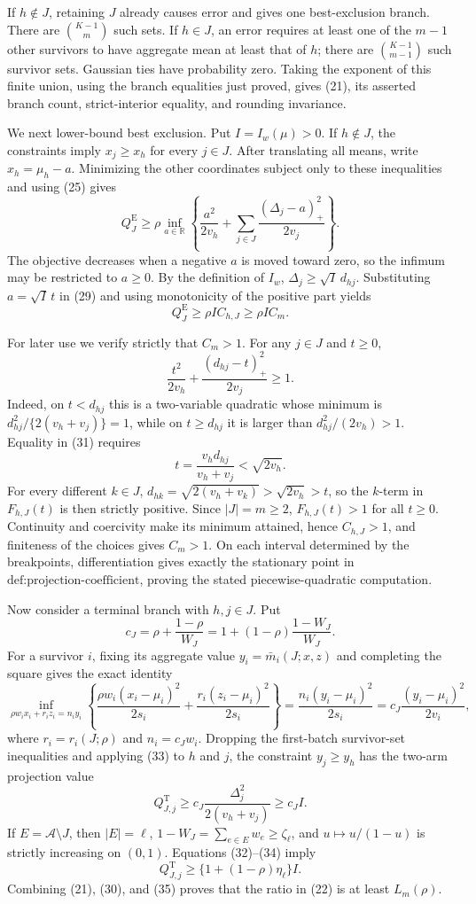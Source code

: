 If \(h\notin J\), retaining \(J\) already causes error and gives one best-exclusion branch. There are \(\binom{K-1}{m}\) such sets. If \(h\in J\), an error requires at least one of the \(m-1\) other survivors to have aggregate mean at least that of \(h\); there are \(\binom{K-1}{m-1}\) such survivor sets. Gaussian ties have probability zero. Taking the exponent of this finite union, using the branch equalities just proved, gives (21), its asserted branch count, strict-interior equality, and rounding invariance.

We next lower-bound best exclusion. Put \(I=I_w(\mu)>0\). If \(h\notin J\), the constraints imply \(x_j\ge x_h\) for every \(j\in J\). After translating all means, write \(x_h=\mu_h-a\). Minimizing the other coordinates subject only to these inequalities and using (25) gives
\[
 Q_J^{\mathrm E}\ge \rho\inf_{a\in\mathbb R}
 \left\{\frac{a^2}{2v_h}+\sum_{j\in J}\frac{(\Delta_j-a)_+^2}{2v_j}\right\}. \tag{29}
\]
The objective decreases when a negative \(a\) is moved toward zero, so the infimum may be restricted to \(a\ge0\). By the definition of \(I_w\), \(\Delta_j\ge\sqrt I\,d_{hj}\). Substituting \(a=\sqrt I\,t\) in (29) and using monotonicity of the positive part yields
\[
 Q_J^{\mathrm E}\ge \rho I C_{h,J}\ge \rho I C_m. \tag{30}
\]

For later use we verify strictly that \(C_m>1\). For any \(j\in J\) and \(t\ge0\),
\[
 \frac{t^2}{2v_h}+\frac{(d_{hj}-t)_+^2}{2v_j}\ge1. \tag{31}
\]
Indeed, on \(t<d_{hj}\) this is a two-variable quadratic whose minimum is \(d_{hj}^2/\{2(v_h+v_j)\}=1\), while on \(t\ge d_{hj}\) it is larger than \(d_{hj}^2/(2v_h)>1\). Equality in (31) requires
\[
 t=\frac{v_h d_{hj}}{v_h+v_j}<\sqrt{2v_h}.
\]
For every different \(k\in J\), \(d_{hk}=\sqrt{2(v_h+v_k)}>\sqrt{2v_h}>t\), so the \(k\)-term in \(F_{h,J}(t)\) is then strictly positive. Since \(|J|=m\ge2\), \(F_{h,J}(t)>1\) for all \(t\ge0\). Continuity and coercivity make its minimum attained, hence \(C_{h,J}>1\), and finiteness of the choices gives \(C_m>1\). On each interval determined by the breakpoints, differentiation gives exactly the stationary point in \(\text{def:projection-coefficient}\), proving the stated piecewise-quadratic computation.

Now consider a terminal branch with \(h,j\in J\). Put
\[
 c_J=\rho+\frac{1-\rho}{W_J}=1+(1-\rho)\frac{1-W_J}{W_J}. \tag{32}
\]
For a survivor \(i\), fixing its aggregate value \(y_i=\bar m_i(J;x,z)\) and completing the square gives the exact identity
\[
 \inf_{\rho w_i x_i+r_i z_i=n_i y_i}
 \left\{\frac{\rho w_i(x_i-\mu_i)^2}{2s_i}
 +\frac{r_i(z_i-\mu_i)^2}{2s_i}\right\}
 =\frac{n_i(y_i-\mu_i)^2}{2s_i}
 =c_J\frac{(y_i-\mu_i)^2}{2v_i}, \tag{33}
\]
where \(r_i=r_i(J;\rho)\) and \(n_i=c_Jw_i\). Dropping the first-batch survivor-set inequalities and applying (33) to \(h\) and \(j\), the constraint \(y_j\ge y_h\) has the two-arm projection value
\[
 Q_{J,j}^{\mathrm T}\ge c_J\frac{\Delta_j^2}{2(v_h+v_j)}\ge c_J I. \tag{34}
\]
If \(E=\mathcal A\setminus J\), then \(|E|=\ell\), \(1-W_J=\sum_{e\in E}w_e\ge\zeta_\ell\), and \(u\mapsto u/(1-u)\) is strictly increasing on \((0,1)\). Equations (32)--(34) imply
\[
 Q_{J,j}^{\mathrm T}\ge \{1+(1-\rho)\eta_\ell\}I. \tag{35}
\]
Combining (21), (30), and (35) proves that the ratio in (22) is at least \(L_m(\rho)\).

